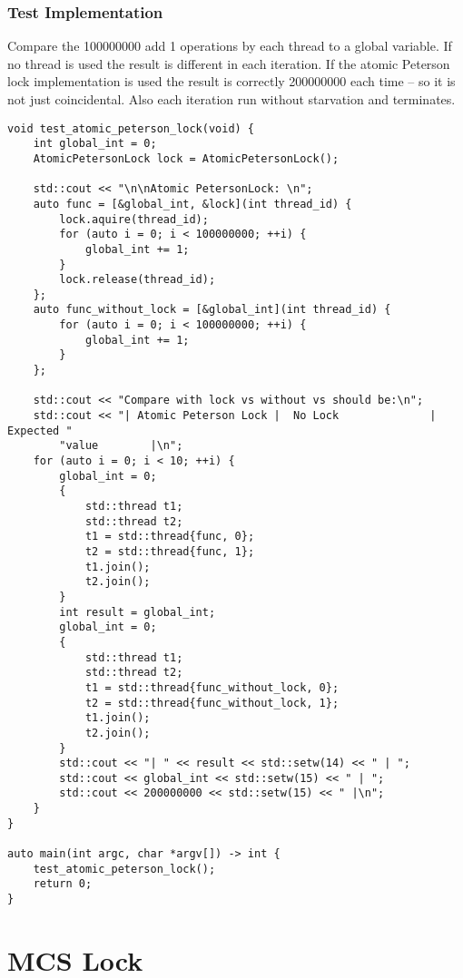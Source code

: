 \documentclass[11pt]{article}
\begin{document}
\subsubsection{Test Implementation}
\label{sec:orgbc0371d}
Compare the 100000000 add 1 operations by each thread to a global
variable. If no thread is used the  result is different in each
iteration. If the atomic Peterson lock implementation is used the
result is correctly 200000000 each time – so it is not just
coincidental. Also each iteration run without starvation and
terminates.
\begin{verbatim}
void test_atomic_peterson_lock(void) {
    int global_int = 0;
    AtomicPetersonLock lock = AtomicPetersonLock();

    std::cout << "\n\nAtomic PetersonLock: \n";
    auto func = [&global_int, &lock](int thread_id) {
        lock.aquire(thread_id);
        for (auto i = 0; i < 100000000; ++i) {
            global_int += 1;
        }
        lock.release(thread_id);
    };
    auto func_without_lock = [&global_int](int thread_id) {
        for (auto i = 0; i < 100000000; ++i) {
            global_int += 1;
        }
    };

    std::cout << "Compare with lock vs without vs should be:\n";
    std::cout << "| Atomic Peterson Lock |  No Lock              | Expected "
        "value        |\n";
    for (auto i = 0; i < 10; ++i) {
        global_int = 0;
        {
            std::thread t1;
            std::thread t2;
            t1 = std::thread{func, 0};
            t2 = std::thread{func, 1};
            t1.join();
            t2.join();
        }
        int result = global_int;
        global_int = 0;
        {
            std::thread t1;
            std::thread t2;
            t1 = std::thread{func_without_lock, 0};
            t2 = std::thread{func_without_lock, 1};
            t1.join();
            t2.join();
        }
        std::cout << "| " << result << std::setw(14) << " | ";
        std::cout << global_int << std::setw(15) << " | ";
        std::cout << 200000000 << std::setw(15) << " |\n";
    }
}

auto main(int argc, char *argv[]) -> int {
    test_atomic_peterson_lock();
    return 0;
}

\end{verbatim}
\section{MCS Lock}
\label{sec:org3bc535f}
\end{document}
